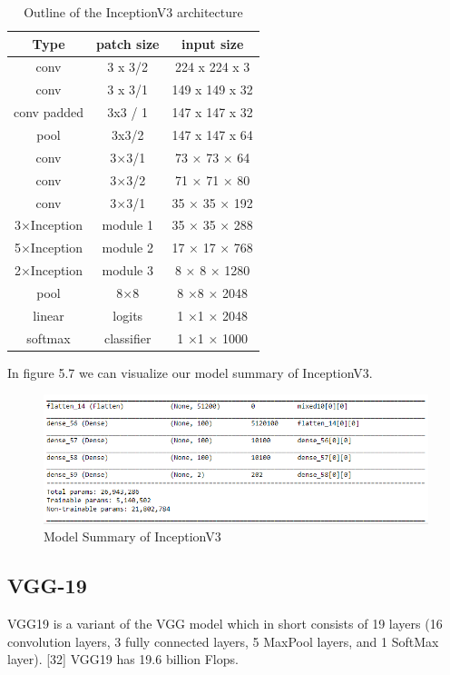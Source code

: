 \begin{table}[hbt!]
\centering
\begin{tabular}{|c | c | c|}
\hline
Type & patch size & input size\\
\hline
conv & 3 x 3/2 & 224 x 224 x 3\\
\hline
conv & 3 x 3/1 & 149 x 149 x 32\\
\hline
conv padded & 3x3 / 1 & 147 x 147 x 32\\
\hline
pool & 3x3/2 & 147 x 147 x 64\\
\hline
conv & 3×3/1 & 73 × 73 × 64\\
\hline
conv & 3×3/2 & 71 × 71 × 80\\
\hline
conv & 3×3/1 & 35 × 35 × 192\\
\hline
3×Inception & module 1 & 35 × 35 × 288\\
\hline
5×Inception & module 2 & 17 × 17 × 768\\
\hline
2×Inception & module 3 & 8 × 8 × 1280\\
\hline
pool & 8×8 & 8 ×8 × 2048\\
\hline
linear & logits & 1 ×1 × 2048\\
\hline
softmax & classifier & 1 ×1 × 1000\\
\hline

\end{tabular}
\caption{Outline of the InceptionV3 architecture}
\label{tab:Outline of the InceptionV3 architecture [31]
)}
\end{table}

\noindent In figure 5.7 we can visualize our model summary of InceptionV3.

\vspace{5mm}
\begin{figure}[hbt!]
\centering
\includegraphics[scale=0.75]{images/fig-11.png}
\caption{Model Summary of InceptionV3}
\label{fig:x Model Summary of InceptionV3}
\end{figure}

\subsection{VGG-19}
VGG19 is a variant of the VGG model which in short consists of 19 layers (16 convolution layers, 3 fully connected layers, 5 MaxPool layers, and 1 SoftMax layer). [32] VGG19 has 19.6 billion Flops.

